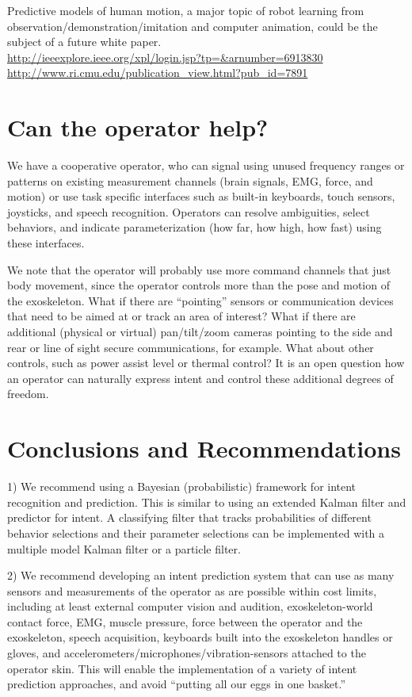 \documentclass[letterpaper,12pt,fullpage]{article}
\begin{document}
Predictive models of human motion, a major topic of robot learning from\\
observation/demonstration/imitation and computer animation,
could be the subject of a future white
paper.\\
\url{http://ieeexplore.ieee.org/xpl/login.jsp?tp=&arnumber=6913830}\\
\url{http://www.ri.cmu.edu/publication_view.html?pub_id=7891}

\section{Can the operator help?}

We have a cooperative operator, who can signal using unused frequency
ranges or patterns on existing measurement
channels (brain signals, EMG, force, and motion) or use 
task specific interfaces such as built-in keyboards, touch sensors, joysticks,
and speech recognition.
Operators can resolve ambiguities, select behaviors, and indicate
parameterization (how far, how high, how fast) using these interfaces.

We note that the operator will probably use more command channels that just
body movement, since
the operator controls more than the pose and motion of the
exoskeleton. What if there are ``pointing'' sensors or communication
devices that need to be aimed at or track an area of interest? What if
there are additional (physical or virtual) pan/tilt/zoom cameras
pointing to the side and rear or line of sight secure communications,
for example. What about other controls, such as power assist level or
thermal control? It is an open question
how an operator can naturally express intent and
control these additional degrees of freedom.

\section{Conclusions and Recommendations}

1) We recommend using a Bayesian (probabilistic) framework for intent recognition
and prediction. This is similar to using an extended
Kalman filter and predictor for intent.
A classifying filter that tracks probabilities of different behavior selections
and their parameter selections can be implemented with a multiple model Kalman
filter or a particle filter.

2) We recommend developing an intent prediction system that can use
as many sensors and measurements of the operator as are possible within cost limits,
including at least external computer vision and audition, exoskeleton-world contact
force,
EMG, muscle pressure, force between the operator and the
exoskeleton,
speech acquisition, keyboards built into the exoskeleton handles or gloves,
and accelerometers/microphones/vibration-sensors attached to the operator skin.
This will enable the implementation of a variety of intent prediction approaches,
and avoid ``putting all our eggs in one basket.''
\end{document}
